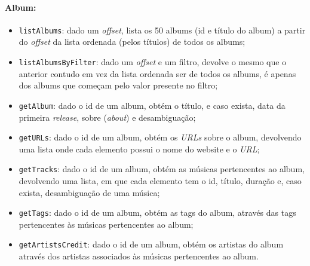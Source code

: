 \documentclass{article}
\begin{document}
\paragraph{\textbf{Album:}}
    \begin{itemize}
        \item \texttt{listAlbums}: dado um \textit{offset}, lista os 50 albums (id e título do album) a partir do \textit{offset} da lista ordenada (pelos títulos) de todos os albums;
        \item \texttt{listAlbumsByFilter}: dado um \textit{offset} e um filtro, devolve o mesmo que o anterior contudo em vez da lista ordenada ser de todos os albums, é apenas dos albums que começam pelo valor presente no filtro;
        \item \texttt{getAlbum}: dado o id de um album, obtém o título, e caso exista, data da primeira \textit{release}, sobre (\textit{about}) e desambiguação;
        \item \texttt{getURLs}: dado o id de um album, obtém os \textit{URLs} sobre o album, devolvendo uma lista onde cada elemento possui o nome do website e o \textit{URL};
        \item \texttt{getTracks}: dado o id de um album, obtém as músicas pertencentes ao album, devolvendo uma lista, em que cada elemento tem o id, título, duração e, caso exista, desambiguação de uma música;
        \item \texttt{getTags}: dado o id de um album, obtém as tags do album, através das tags pertencentes às músicas pertencentes ao album;
        \item \texttt{getArtistsCredit}: dado o id de um album, obtém os artistas do album através dos artistas associados às músicas pertencentes ao album.
    \end{itemize}
\end{document}
